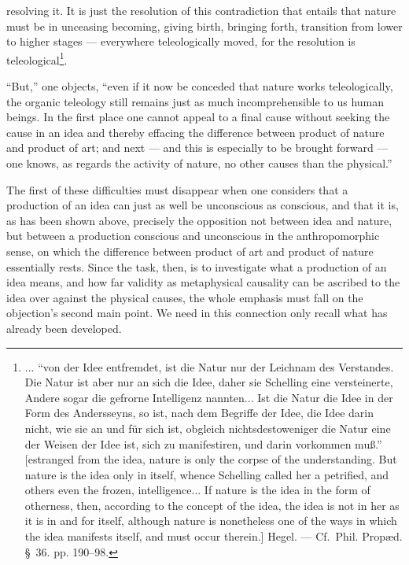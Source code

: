 \documentclass[12pt,a4paper]{book}
\begin{document}
\setcounter{footnote}{1}
resolving it. It is just the resolution of this contradiction that entails that
nature must be in unceasing becoming, giving birth, bringing forth, transition
from lower to higher stages --- everywhere teleologically moved, for the
resolution is teleological\footnote{... ``von der Idee entfremdet, ist die Natur
nur der Leichnam des Verstandes. Die Natur ist aber nur an sich die Idee, daher
sie Schelling eine versteinerte, Andere sogar die gefrorne Intelligenz
nannten... Ist die Natur die Idee in der Form des Andersseyns, so ist, nach dem
Begriffe der Idee, die Idee darin nicht, wie sie an und für sich ist, obgleich
nichtsdestoweniger die Natur eine der Weisen der Idee ist, sich zu manifestiren,
und darin vorkommen muß.'' [estranged from the idea, nature is only the corpse
of the understanding. But nature is the idea only in itself, whence Schelling
called her a petrified, and others even the frozen, intelligence... If nature is
the idea in the form of otherness, then, according to the concept of the idea,
the idea is not in her as it is in and for itself, although nature is
nonetheless one of the ways in which the idea manifests itself, and must occur
therein.] Hegel. --- Cf.\ Phil. Propæd. §~36. pp. 190--98.}.

``But,'' one objects, ``even if it now be conceded that nature works
teleologically, the organic teleology still remains just as much incomprehensible
to us human beings. In the first place one cannot appeal to a final cause without
seeking the cause in an idea and thereby effacing the difference between product
of nature and product of art; and next --- and this is especially to be brought
forward --- one knows, as regards the activity of nature, no other causes than
the physical.''

The first of these difficulties must disappear when one considers that a
production of an idea can just as well be unconscious as conscious, and that it
is, as has been shown above, precisely the opposition not between idea and
nature, but between a production conscious and unconscious in the
anthropomorphic sense, on which the difference between product of art and
product of nature essentially rests. Since the task, then, is to investigate what
a production of an idea means, and how far validity as metaphysical causality can
be ascribed to the idea over against the physical causes, the whole emphasis must
fall on the objection's second main point. We need in this connection only recall
what has already been developed.
\end{document}
